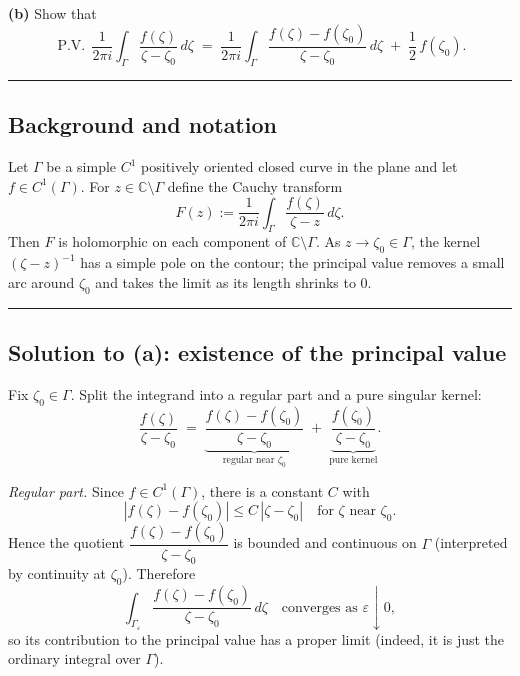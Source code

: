 \documentclass[11pt]{article}
\begin{document}
	\medskip
	
	\noindent\textbf{(b)} Show that
	\[
	\operatorname{P.V.}\,\frac{1}{2\pi i}\int_{\Gamma}\frac{f(\zeta)}{\zeta-\zeta_{0}}\,d\zeta
	\;=\;
	\frac{1}{2\pi i}\int_{\Gamma}\frac{f(\zeta)-f(\zeta_{0})}{\zeta-\zeta_{0}}\,d\zeta
	\;+\;\frac{1}{2}\,f(\zeta_{0}).
	\]
	
	\bigskip\hrule\bigskip
	
	\subsection*{Background and notation}
	
	Let $\Gamma$ be a simple $C^{1}$ positively oriented closed curve in the plane and let $f\in C^{1}(\Gamma)$.
	For $z\in\mathbb{C}\setminus\Gamma$ define the Cauchy transform
	\[
	F(z):=\frac{1}{2\pi i}\int_{\Gamma}\frac{f(\zeta)}{\zeta-z}\,d\zeta.
	\]
	Then $F$ is holomorphic on each component of $\mathbb{C}\setminus\Gamma$.
	As $z\to\zeta_{0}\in\Gamma$, the kernel $(\zeta-z)^{-1}$ has a simple pole on the contour; the principal value removes a small arc around $\zeta_{0}$ and takes the limit as its length shrinks to $0$.
	
	\bigskip\hrule\bigskip
	
	\subsection*{Solution to (a): existence of the principal value}
	
	Fix $\zeta_{0}\in\Gamma$.
	Split the integrand into a regular part and a pure singular kernel:
	\[
	\frac{f(\zeta)}{\zeta-\zeta_{0}}
	\;=\;
	\underbrace{\frac{f(\zeta)-f(\zeta_{0})}{\zeta-\zeta_{0}}}_{\text{regular near }\zeta_{0}}
	\;+\;
	\underbrace{\frac{f(\zeta_{0})}{\zeta-\zeta_{0}}}_{\text{pure kernel}}.
	\tag{1}
	\]
	
	\emph{Regular part.}
	Since $f\in C^{1}(\Gamma)$, there is a constant $C$ with
	\[
	|f(\zeta)-f(\zeta_{0})|\le C\,|\zeta-\zeta_{0}|
	\quad\text{for }\zeta\text{ near }\zeta_{0}.
	\]
	Hence the quotient $\dfrac{f(\zeta)-f(\zeta_{0})}{\zeta-\zeta_{0}}$ is bounded and continuous on $\Gamma$ (interpreted by continuity at $\zeta_{0}$).
	Therefore
	\[
	\int_{\Gamma_{\varepsilon}}\frac{f(\zeta)-f(\zeta_{0})}{\zeta-\zeta_{0}}\,d\zeta
	\quad\text{converges as }\varepsilon\downarrow 0,
	\]
	so its contribution to the principal value has a proper limit (indeed, it is just the ordinary integral over $\Gamma$).
	
	\medskip
	
\end{document}
